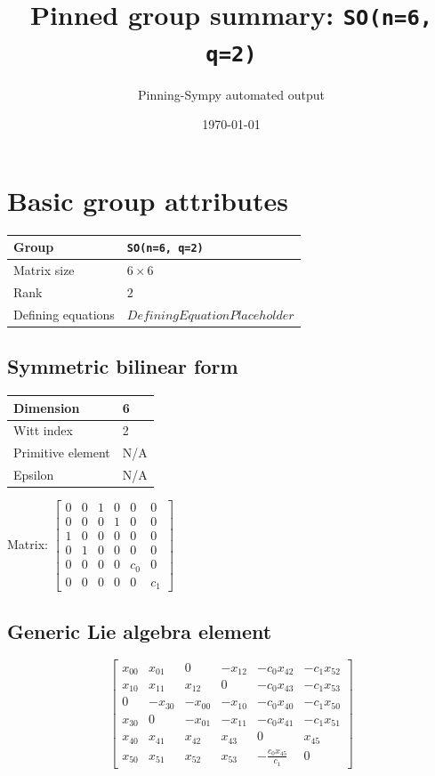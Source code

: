 \documentclass[11pt]{article}
\title{Pinned group summary: \texttt{SO(n=6, q=2)}}
\author{Pinning-Sympy automated output}
\date{\today}
\theoremstyle{definition}
\begin{document}
\maketitle
\tableofcontents

\newpage

\section{Basic group attributes}

\begin{tabular}{|l|l|}
	\hline
    Group & \texttt{SO(n=6, q=2)} \\
	\hline
    Matrix size & $6 \times 6$ \\
	\hline
    Rank & $2$ \\
	\hline
	Defining equations & $DefiningEquationPlaceholder$ \\
	\hline
\end{tabular}

\subsection{Symmetric bilinear form}
\begin{tabular}{|l|l|}
    \hline
    Dimension & 6 \\
    \hline
    Witt index & 2 \\
    \hline
    Primitive element & N/A \\
    \hline
    Epsilon & N/A \\
    \hline
\end{tabular}

\bigskip
\noindent Matrix: \(
\left[\begin{matrix}0 & 0 & 1 & 0 & 0 & 0\\0 & 0 & 0 & 1 & 0 & 0\\1 & 0 & 0 & 0 & 0 & 0\\0 & 1 & 0 & 0 & 0 & 0\\0 & 0 & 0 & 0 & c_{0} & 0\\0 & 0 & 0 & 0 & 0 & c_{1}\end{matrix}\right]
\)



\subsection{Generic Lie algebra element}
\[
\left[\begin{matrix}x_{0 0} & x_{0 1} & 0 & - x_{1 2} & - c_{0} x_{4 2} & - c_{1} x_{5 2}\\x_{1 0} & x_{1 1} & x_{1 2} & 0 & - c_{0} x_{4 3} & - c_{1} x_{5 3}\\0 & - x_{3 0} & - x_{0 0} & - x_{1 0} & - c_{0} x_{4 0} & - c_{1} x_{5 0}\\x_{3 0} & 0 & - x_{0 1} & - x_{1 1} & - c_{0} x_{4 1} & - c_{1} x_{5 1}\\x_{4 0} & x_{4 1} & x_{4 2} & x_{4 3} & 0 & x_{4 5}\\x_{5 0} & x_{5 1} & x_{5 2} & x_{5 3} & - \frac{c_{0} x_{4 5}}{c_{1}} & 0\end{matrix}\right]
\]
\end{document}
